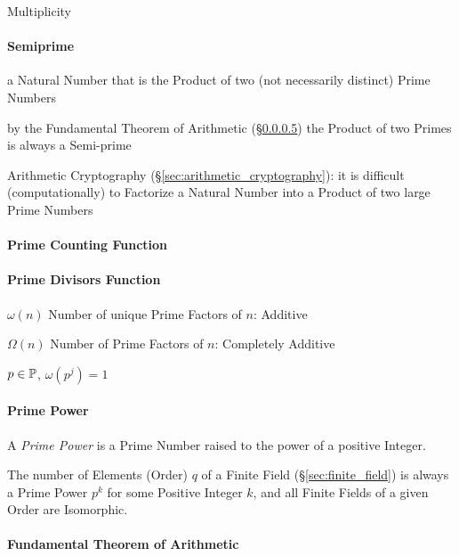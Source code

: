 Multiplicity



\paragraph{Semiprime}\label{sec:semiprime}\hfill

a Natural Number that is the Product of two (not necessarily distinct) Prime
Numbers

by the Fundamental Theorem of Arithmetic
(\S\ref{sec:fundamental_arithmetic_theorem}) the Product of two Primes is
always a Semi-prime

\fist Arithmetic Cryptography (\S\ref{sec:arithmetic_cryptography}): it is
difficult (computationally) to Factorize a Natural Number into a Product of two
large Prime Numbers



\paragraph{Prime Counting Function}\label{sec:prime_counting}\hfill

\paragraph{Prime Divisors Function}\label{sec:prime_divisors}\hfill

$\omega(n)$ Number of unique Prime Factors of $n$: Additive

$\Omega(n)$ Number of Prime Factors of $n$: Completely Additive

$p \in \mathbb{P}$, $\omega(p^j) = 1$



\paragraph{Prime Power}\label{sec:prime_power}\hfill

A \emph{Prime Power} is a Prime Number raised to the power of a
positive Integer.

The number of Elements (Order) $q$ of a Finite Field (\S\ref{sec:finite_field})
is always a Prime Power $p^k$ for some Positive Integer $k$, and all Finite
Fields of a given Order are Isomorphic.



\paragraph{Fundamental Theorem of Arithmetic}
\label{sec:fundamental_arithmetic_theorem}\hfill

